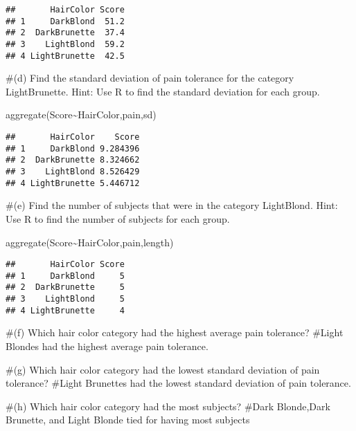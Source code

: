 \documentclass[
]{article}
\newenvironment{Shaded}{\begin{snugshade}}{\end{snugshade}}
\newcommand{\FunctionTok}[1]{\textcolor[rgb]{0.00,0.00,0.00}{#1}}
\newcommand{\NormalTok}[1]{#1}
\newcommand{\SpecialCharTok}[1]{\textcolor[rgb]{0.00,0.00,0.00}{#1}}
\begin{document}
\begin{verbatim}
##       HairColor Score
## 1     DarkBlond  51.2
## 2  DarkBrunette  37.4
## 3    LightBlond  59.2
## 4 LightBrunette  42.5
\end{verbatim}

\#(d) Find the standard deviation of pain tolerance for the category
LightBrunette. Hint: Use R to find the standard deviation for each
group.

\begin{Shaded}
\begin{Highlighting}[]
\FunctionTok{aggregate}\NormalTok{(Score}\SpecialCharTok{\textasciitilde{}}\NormalTok{HairColor,pain,sd)}
\end{Highlighting}
\end{Shaded}

\begin{verbatim}
##       HairColor    Score
## 1     DarkBlond 9.284396
## 2  DarkBrunette 8.324662
## 3    LightBlond 8.526429
## 4 LightBrunette 5.446712
\end{verbatim}

\#(e) Find the number of subjects that were in the category LightBlond.
Hint: Use R to find the number of subjects for each group.

\begin{Shaded}
\begin{Highlighting}[]
\FunctionTok{aggregate}\NormalTok{(Score}\SpecialCharTok{\textasciitilde{}}\NormalTok{HairColor,pain,length)}
\end{Highlighting}
\end{Shaded}

\begin{verbatim}
##       HairColor Score
## 1     DarkBlond     5
## 2  DarkBrunette     5
## 3    LightBlond     5
## 4 LightBrunette     4
\end{verbatim}

\#(f) Which hair color category had the highest average pain tolerance?
\#Light Blondes had the highest average pain tolerance.

\#(g) Which hair color category had the lowest standard deviation of
pain tolerance? \#Light Brunettes had the lowest standard deviation of
pain tolerance.

\#(h) Which hair color category had the most subjects? \#Dark
Blonde,Dark Brunette, and Light Blonde tied for having most subjects
\end{document}
